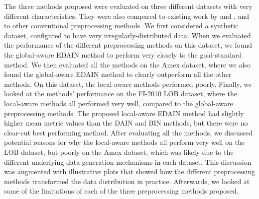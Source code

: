 \documentclass{statsmsc}
\begin{document}
{%
The three methods proposed were evaluated on three different
datasets with very different characteristics. They were also compared to existing work by
\cite{dain} and \cite{bin}, and to other conventional preprocessing methods.
We first considered a synthetic dataset,
 configured to have very irregularly-distributed data. 
When we evaluated the performance of the different preprocessing methods on this dataset, we found
the global-aware \ac{EDAIN} method to perform very closely to the gold-standard method.
We then evaluated all the methods on the Amex dataset, where we also found the
global-aware \ac{EDAIN} method to clearly outperform all the other methods. On
this dataset, the local-aware methods performed poorly. Finally, we looked at
the methods' performance on the FI-2010 \ac{LOB} dataset, where the local-aware
methods all performed very well, compared to the global-aware preprocessing
methods. The proposed local-aware \ac{EDAIN} method had slightly higher mean metric values
than the \ac{DAIN} and \ac{BIN} methods, but there were no clear-cut best performing method.
After evaluating all the methods, we discussed potential reasons for why the local-aware methods
all perform very well on the \ac{LOB} dataset, but poorly on the Amex dataset,
which was likely due to the different underlying data generation mechanisms in each dataset.
This discussion was augmented with illustrative plots that showed how the different
preprocessing methods transformed the data distribution in practice.
Afterwards, we looked at some of the limitations of each of the three preprocessing
methods proposed.

}
\end{document}
